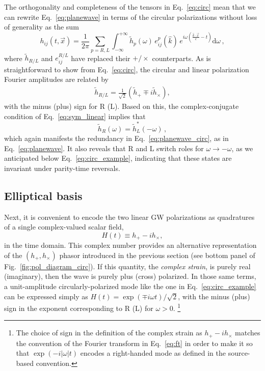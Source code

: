 \documentclass[aps,prd,twocolumn,superscriptaddress,preprintnumbers,floatfix,nofootinbib]{revtex4-2}
\newcommand{\beq}{\begin{equation}}
\newcommand{\eeq}{\end{equation}}
\newcommand*{\eq}[1]{Eq.~\eqref{eq:#1}}
\newcommand{\infd}{\mathrm{d}}
\begin{document}
The orthogonality and completeness of the tensors in Eq.~\eqref{eq:circ} mean that we can rewrite Eq.~\eqref{eq:planewave} in terms of the circular polarizations without loss of generality as the sum
\beq \label{eq:planewave_circ}
h_{ij}(t,\vec{x}) 
= \frac{1}{2\pi} \sum_{p=R,L} \int_{-\infty}^{+\infty} \tilde{h}_p(\omega)\, e^p_{ij}(\hat{k})\, e^{i\omega \left(\frac{\hat{k}\cdot\vec{x}}{c}-t\right)} \infd \omega \, ,
\eeq
where $\tilde{h}_{R/L}$ and $e^{R/L}_{ij}$ have replaced their $+/\times$ counterparts.
As is straightforward to show from Eq.~\eqref{eq:circ}, the circular and linear polarization Fourier amplitudes are related by
\begin{align} \label{eq:circ_amps}
\tilde{h}_{R/L} = \frac{1}{\sqrt{2}} \left(\tilde{h}_+ \mp i\tilde{h}_\times \right) ,
\end{align}
with the minus (plus) sign for R (L).
Based on this, the complex-conjugate condition of Eq.~\eqref{eq:sym_linear} implies that
\beq \label{eq:sym_circular}
\tilde{h}_R(\omega) = \tilde{h}_L^*(-\omega) \, ,
\eeq
which again manifests the redundancy in Eq.~\eqref{eq:planewave_circ}, as in Eq.~\eqref{eq:planewave}.
It also reveals that R and L switch roles for $\omega \to - \omega$, as we anticipated below Eq.~\eqref{eq:circ_example}, indicating that these states are invariant under parity-time reversals.


\subsection{Elliptical basis}
\label{sec:ellip}


Next, it is convenient to encode the two linear GW polarizations as quadratures of a single complex-valued scalar field, 
\beq
H(t) \equiv h_+ - i h_\times,
\eeq
in the time domain.
This complex number provides an alternative representation of the $\left(h_+, h_\times\right)$ phasor introduced in the previous section (see bottom panel of Fig.~\ref{fig:pol_diagram_circ}).
If this quantity, the \emph{complex strain}, is purely real (imaginary), then the wave is purely plus (cross) polarized.
In those same terms, a unit-amplitude circularly-polarized mode like the one in \eq{circ_example} can be expressed simply as $H(t)  = \exp(\mp i \omega t)/\sqrt{2}$, with the minus (plus) sign in the exponent corresponding to R (L) for $\omega > 0$.%
\footnote{The choice of sign in the definition of the complex strain as $h_+ - ih_\times$ matches the convention of the Fourier transform in Eq.~\eqref{eq:ft} in order to make it so that $\exp(-i|\omega| t)$ encodes a right-handed mode as defined in the source-based convention.}
\end{document}
